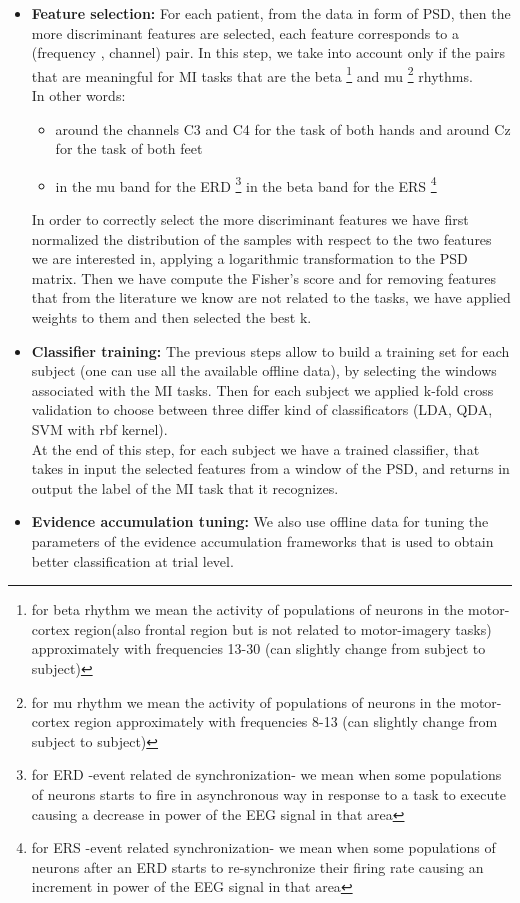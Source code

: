 \begin{itemize}
\item \textbf{Feature selection:}  For each patient, from the data in form of PSD, then the more discriminant features are selected, each feature corresponds to a (frequency , channel) pair. In this step, we take into account only if the pairs that are meaningful for MI tasks that are the beta
\footnote{for beta rhythm we mean the activity of populations of neurons in the motor-cortex region(also frontal region but is not related to motor-imagery tasks) approximately with frequencies 13-30 (can slightly change from subject to subject)}
 and mu
 \footnote{for mu rhythm we mean the activity of populations of neurons in the motor-cortex region approximately with frequencies 8-13 (can slightly change from subject to subject)}
rhythms.\\
In other words:
\begin{itemize}
\item around the channels C3 and C4 for the task of both hands and around Cz for the task of both feet
\item  in the mu band for the ERD
 \footnote{for ERD -event related de synchronization- we mean when some populations of neurons starts to fire in asynchronous way in response to a task to execute causing a decrease in power of the EEG signal in that area}
 in the beta band for the ERS 
 \footnote{for ERS -event related synchronization- we mean when some populations of neurons after an ERD starts to re-synchronize their firing rate causing an increment in power of the EEG signal in that area}
\end{itemize}
In order to correctly select the more discriminant features we have first normalized the distribution of the samples with respect to the two features we are interested in, applying a logarithmic transformation to the PSD matrix.
Then we have compute the Fisher's score and for removing features that from the literature we know are not related to the tasks, we have applied weights to them and then selected the best k.
\item \textbf{Classifier training:} The previous steps allow to build a training set for each subject (one can use all the available offline data), by selecting the windows associated with the MI tasks. Then for each subject we applied k-fold cross validation to choose between three differ kind of classificators (LDA, QDA, SVM with rbf kernel).\\
At the end of this step, for each subject we have a trained classifier, that takes in input the selected features from a window of the PSD, and returns in output the label of the MI task that it recognizes. \\
\item \textbf{Evidence accumulation tuning:} We also use offline data for tuning the parameters of the evidence accumulation frameworks that is used to obtain better classification at trial level. 
\end{itemize}

